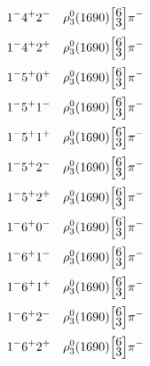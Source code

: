 \documentclass[10pt,a4paper]{article}
\def\dst{\displaystyle}
\def\vsp{\hbox{\vrule height12.5pt depth3.5pt width0pt}}
\def\ells#1#2{\Big[\hskip-5pt\vsp\begin{array}{c}\dst#1\\[-4pt]\dst#2\end{array}\vsp\hskip-5pt\Big]}
\begin{document}
\begin{align*} 
 \begin{aligned}
1^{-}4^{+}2^{-}\quad & \rho_3^0(1690)\ells{6}{3}\pi^-\\
1^{-}4^{+}2^{+}\quad & \rho_3^0(1690)\ells{6}{3}\pi^-\\
1^{-}5^{+}0^{+}\quad & \rho_3^0(1690)\ells{6}{3}\pi^-\\
1^{-}5^{+}1^{-}\quad & \rho_3^0(1690)\ells{6}{3}\pi^-\\
1^{-}5^{+}1^{+}\quad & \rho_3^0(1690)\ells{6}{3}\pi^-\\
1^{-}5^{+}2^{-}\quad & \rho_3^0(1690)\ells{6}{3}\pi^-\\
1^{-}5^{+}2^{+}\quad & \rho_3^0(1690)\ells{6}{3}\pi^-\\
1^{-}6^{+}0^{-}\quad & \rho_3^0(1690)\ells{6}{3}\pi^-\\
1^{-}6^{+}1^{-}\quad & \rho_3^0(1690)\ells{6}{3}\pi^-\\
1^{-}6^{+}1^{+}\quad & \rho_3^0(1690)\ells{6}{3}\pi^-\\
1^{-}6^{+}2^{-}\quad & \rho_3^0(1690)\ells{6}{3}\pi^-\\
1^{-}6^{+}2^{+}\quad & \rho_3^0(1690)\ells{6}{3}\pi^-\\
\end{aligned} 
 \end{align*}
\end{document}
